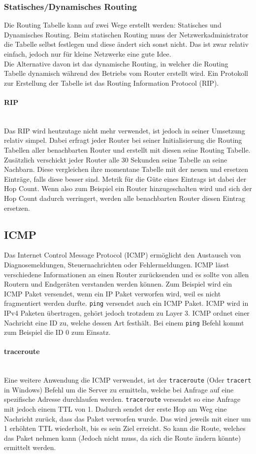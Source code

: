 \documentclass{article}
\newcommand{\paragraphlb}[1]{\paragraph{#1}\mbox{}\\}
\begin{document}
	 \subsubsection{Statisches/Dynamisches Routing}
	 Die Routing Tabelle kann auf zwei Wege erstellt werden: Statisches und Dynamisches Routing. Beim statischen Routing muss der Netzwerkadministrator die Tabelle selbst festlegen und diese ändert sich sonst nicht. Das ist zwar relativ einfach, jedoch nur für kleine Netzwerke eine gute Idee. \\
	 Die Alternative davon ist das dynamische Routing, in welcher die Routing Tabelle dynamisch während des Betriebs vom Router erstellt wird. Ein Protokoll zur Erstellung der Tabelle ist das Routing Information Protocol (RIP). \\
	 \paragraphlb{RIP}
	 Das RIP wird heutzutage nicht mehr verwendet, ist jedoch in seiner Umsetzung relativ simpel. Dabei erfragt jeder Router bei seiner Initialisierung die Routing Tabellen aller benachbarten Router und erstellt mit diesen seine Routing Tabelle. Zusätzlich verschickt jeder Router alle 30 Sekunden seine Tabelle an seine Nachbarn. Diese vergleichen ihre momentane Tabelle mit der neuen und ersetzen Einträge, falls diese besser sind. Metrik für die Güte eines Eintrags ist dabei der Hop Count. Wenn also zum Beispiel ein Router hinzugeschalten wird und sich der Hop Count dadurch verringert, werden alle benachbarten Router diesen Eintrag ersetzen.
	 \subsection{ICMP}
	 Das Internet Control Message Protocol (ICMP) ermöglicht den Austausch von Diagnosemeldungen, Steuernachrichten oder Fehlermeldungen. ICMP lässt verschiedene Informationen an einen Router zurücksenden und es sollte von allen Routern und Endgeräten verstanden werden können. Zum Beispiel wird ein ICMP Paket versendet, wenn ein IP Paket verworfen wird, weil es nicht fragmentiert werden durfte. \verb|ping| versendet auch ein ICMP Paket. ICMP wird in IPv4 Paketen übertragen, gehört jedoch trotzdem zu Layer 3. ICMP ordnet einer Nachricht eine ID zu, welche dessen Art festhält. Bei einem \verb|ping| Befehl kommt zum Beispiel die ID 0 zum Einsatz. \\
	 \paragraphlb{traceroute}
	 Eine weitere Anwendung die ICMP verwendet, ist der \verb|traceroute| (Oder \verb|tracert| in Windows) Befehl um die Server zu ermitteln, welche bei Anfrage auf eine spezifische Adresse durchlaufen werden. \verb|traceroute| versendet so eine Anfrage mit jedoch einem TTL von 1. Dadurch sendet der erste Hop am Weg eine Nachricht zurück, dass das Paket verworfen wurde. Das wird jeweils mit einer um 1 erhöhten TTL wiederholt, bis es sein Ziel erreicht. So kann die Route, welches das Paket nehmen kann (Jedoch nicht muss, da sich die Route ändern könnte) ermittelt werden. \\
\end{document}
